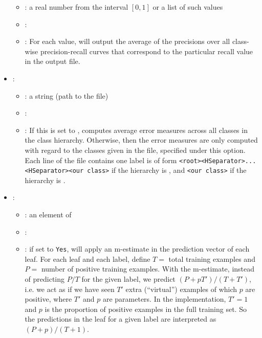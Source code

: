 \begin{itemize}
           \begin{itemize}
                \item \optionPossibleValues{}: a real number from the interval $[0, 1]$ or a list of such values
                \item \optionDefaultValue{}: 
                \item \optionDescrption{}: For each value, \clus{} will output the average of the precisions over all class-wise precision-recall curves that correspond to the particular recall value in the output file.
           \end{itemize}
    \item {}:
           \begin{itemize}
                \item \optionPossibleValues{}: a string (path to the file)
                \item \optionDefaultValue{}: 
                \item \optionDescrption{}:  If this is set to , \clus{} computes average error measures across all classes in the class hierarchy. Otherwise, then the error measures are only computed with regard to the classes given in the file, specified under this option. Each line of the file contains one label is of form
                \texttt{<root><HSeparator>...<HSeparator><our class>} if the hierarchy is , and \texttt{<our class>} if the hierarchy is .
           \end{itemize}
    \item {}:
           \begin{itemize}
                \item \optionPossibleValues{}: an element of 
                \item \optionDefaultValue{}: 
                \item \optionDescrption{}: if set to {\tt Yes}, \clus{} will apply an m-estimate in the prediction vector of each leaf. For each leaf and each label, define $T =$ total training examples and $P =$ number of positive training examples. With the m-estimate, instead of predicting $P/T$ for the given label, we predict $(P + p T') /
                (T+T')$, i.e. we act as if we have seen $T'$ extra (``virtual'') examples of
                which $p$ are positive, where $T'$ and $p$ are parameters. In the \clus{}
                implementation, $T'=1$ and $p$ is the proportion of positive examples in the full
                training set. So the predictions in the leaf for a given label are interpreted as $(P+p) / (T+1)$.
           \end{itemize}
\end{itemize}


